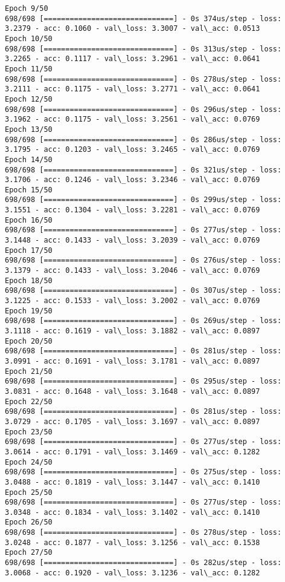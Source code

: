 \documentclass[11pt]{article}
\begin{document}
\begin{Verbatim}[commandchars=\\\{\}]
Epoch 9/50
698/698 [==============================] - 0s 374us/step - loss: 3.2379 - acc: 0.1060 - val\_loss: 3.3007 - val\_acc: 0.0513
Epoch 10/50
698/698 [==============================] - 0s 313us/step - loss: 3.2265 - acc: 0.1117 - val\_loss: 3.2961 - val\_acc: 0.0641
Epoch 11/50
698/698 [==============================] - 0s 278us/step - loss: 3.2111 - acc: 0.1175 - val\_loss: 3.2771 - val\_acc: 0.0641
Epoch 12/50
698/698 [==============================] - 0s 296us/step - loss: 3.1962 - acc: 0.1175 - val\_loss: 3.2561 - val\_acc: 0.0769
Epoch 13/50
698/698 [==============================] - 0s 286us/step - loss: 3.1795 - acc: 0.1203 - val\_loss: 3.2465 - val\_acc: 0.0769
Epoch 14/50
698/698 [==============================] - 0s 321us/step - loss: 3.1706 - acc: 0.1246 - val\_loss: 3.2346 - val\_acc: 0.0769
Epoch 15/50
698/698 [==============================] - 0s 299us/step - loss: 3.1551 - acc: 0.1304 - val\_loss: 3.2281 - val\_acc: 0.0769
Epoch 16/50
698/698 [==============================] - 0s 277us/step - loss: 3.1448 - acc: 0.1433 - val\_loss: 3.2039 - val\_acc: 0.0769
Epoch 17/50
698/698 [==============================] - 0s 276us/step - loss: 3.1379 - acc: 0.1433 - val\_loss: 3.2046 - val\_acc: 0.0769
Epoch 18/50
698/698 [==============================] - 0s 307us/step - loss: 3.1225 - acc: 0.1533 - val\_loss: 3.2002 - val\_acc: 0.0769
Epoch 19/50
698/698 [==============================] - 0s 269us/step - loss: 3.1118 - acc: 0.1619 - val\_loss: 3.1882 - val\_acc: 0.0897
Epoch 20/50
698/698 [==============================] - 0s 281us/step - loss: 3.0991 - acc: 0.1691 - val\_loss: 3.1781 - val\_acc: 0.0897
Epoch 21/50
698/698 [==============================] - 0s 295us/step - loss: 3.0831 - acc: 0.1648 - val\_loss: 3.1648 - val\_acc: 0.0897
Epoch 22/50
698/698 [==============================] - 0s 281us/step - loss: 3.0729 - acc: 0.1705 - val\_loss: 3.1697 - val\_acc: 0.0897
Epoch 23/50
698/698 [==============================] - 0s 277us/step - loss: 3.0614 - acc: 0.1791 - val\_loss: 3.1469 - val\_acc: 0.1282
Epoch 24/50
698/698 [==============================] - 0s 275us/step - loss: 3.0488 - acc: 0.1819 - val\_loss: 3.1447 - val\_acc: 0.1410
Epoch 25/50
698/698 [==============================] - 0s 277us/step - loss: 3.0348 - acc: 0.1834 - val\_loss: 3.1402 - val\_acc: 0.1410
Epoch 26/50
698/698 [==============================] - 0s 278us/step - loss: 3.0248 - acc: 0.1877 - val\_loss: 3.1256 - val\_acc: 0.1538
Epoch 27/50
698/698 [==============================] - 0s 282us/step - loss: 3.0068 - acc: 0.1920 - val\_loss: 3.1236 - val\_acc: 0.1282

\end{Verbatim}
\end{document}
